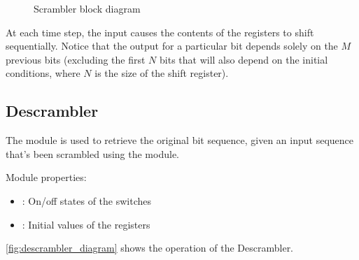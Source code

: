 \begin{figure}
\caption{Scrambler block diagram}
\label{fig:scrambler_diagram}
\end{figure}

At each time step, the input causes the contents of the registers to shift sequentially. Notice that the output for a particular bit depends solely on the $M$ previous bits (excluding the first $N$ bits that will also depend on the initial conditions, where $N$ is the size of the shift register).

\subsection{Descrambler}

The  module is used to retrieve the original bit sequence, given an input sequence that's been scrambled using the  module.

\noindent Module properties:
\begin{itemize}
  \item {}: On/off states of the switches
  \item {}: Initial values of the registers
\end{itemize}

\autoref{fig:descrambler_diagram} shows the operation of the Descrambler.

